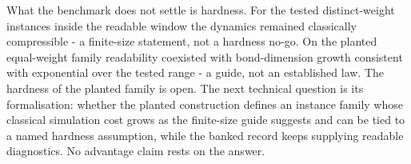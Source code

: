 What the benchmark does not settle is hardness. For the tested distinct-weight instances inside the readable window the dynamics remained classically compressible - a finite-size statement, not a hardness no-go. On the planted equal-weight family readability coexisted with bond-dimension growth consistent with exponential over the tested range - a guide, not an established law. The hardness of the planted family is open. The next technical question is its formalisation: whether the planted construction defines an instance family whose classical simulation cost grows as the finite-size guide suggests and can be tied to a named hardness assumption, while the banked record keeps supplying readable diagnostics. No advantage claim rests on the answer.
